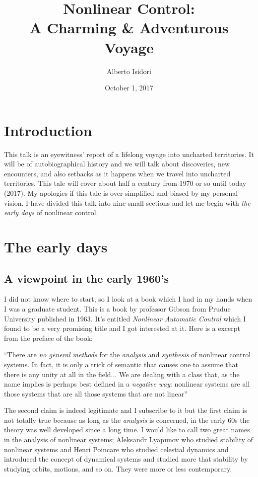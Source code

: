 \documentclass{article}
\title{Nonlinear Control:\\A Charming \& Adventurous Voyage}
\author{Alberto Isidori}
\date{October 1, 2017}
\begin{document}
\maketitle

\section*{Introduction}
This talk is an eyewitness' report of a lifelong voyage into uncharted territories. It will be of autobiographical history and  we will talk about discoveries, new encounters, and also setbacks as it happens when we travel into uncharted territories. This tale will cover about half a century from 1970 or so until today (2017). My apologies if this tale is over simplified and biased by my personal vision. I have divided this talk into nine small sections and let me begin with \textit{the early days} of nonlinear control.

\section{The early days}
\subsection*{A viewpoint in the early 1960's}
I did not know where to start, so I look at a book which I had in my hands when I was a graduate student. This is a book by professor Gibson  from Prudue University published in 1963. It's entitled \textit{Nonlinear Automatic Control} which I found to be a very promising title and I got interested at it. Here is a excerpt from the preface of the book:

``There are \textit{no general methods} for the \textit{analysis} and \textit{synthesis} of nonlinear control systems. In fact, it is only a trick of semantic that causes one to assume that there is any unity at all in the field... We are dealing with a class that, as the name implies is perhaps best defined in a \textit{negative way}: nonlinear systems are all those systems that are all those systems that are not linear''

The second claim is indeed legitimate and I subscribe to it but the first claim is not totally true because as long as the \textit{analysis} is concerned, in the early 60s the theory was well developed since a long time. I would like to call two great names in the analysis of nonlinear systems; Aleksandr Lyapunov who studied stability of nonlinear systems and Henri Poincare who studied celestial dynamics and introduced the concept of dynamical systems and studied more that stability by studying orbits, motions, and so on. They were more or less contemporary.
\end{document}
